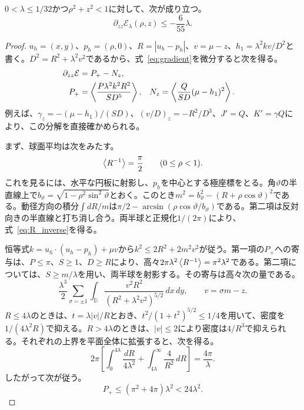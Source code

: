 \begin{lemma}[薄い扁平回転楕円体の一様な軸方向凹性]\label{lem:axial_concavity}
$0<\lambda\le1/32$かつ$\rho^2+z^2<1$に対して、次が成り立つ。
\begin{equation}\label{eq:thin_concavity}
 \partial_{zz}\mathcal E_\lambda(\rho,z)\le-\frac6{55}\lambda.
\end{equation}
\end{lemma}
\begin{proof}
$u_h=(x,y)$、$p_h=(\rho,0)$、$R=|u_h-p_h|$、$v=\mu-z$、$h_1=\lambda^2kv/D^2$と書く。$D^2=R^2+\lambda^2v^2$であるから、式~\eqref{eq:gradient}を微分すると次を得る。
\begin{align}
 \partial_{zz}\mathcal E&=P_+-N_z,\label{eq:positive_negative}\\
 P_+&=\left\langle \frac{P\lambda^2k^2R^2}{SD^5}\right\rangle,&
 N_z&=\left\langle \frac Q{SD}(\mu-h_1)^2\right\rangle.\nonumber
\end{align}
例えば、$\gamma_z=-(\mu-h_1)/(SD)$、$(v/D)_z=-R^2/D^3$、$J'=Q$、$K'=\gamma Q$により、この分解を直接確かめられる。

まず、球面平均は次をみたす。
\begin{equation}\label{eq:R_inverse}
 \left\langle R^{-1}\right\rangle=\frac\pi2\qquad(0\le\rho<1).
\end{equation}
これを見るには、水平な円板に射影し、$p_h$を中心とする極座標をとる。角$\vartheta$の半直線上で$b_\vartheta=\sqrt{1-\rho^2\sin^2\vartheta}$とおく。このとき$m^2=b_\vartheta^2-(R+\rho\cos\vartheta)^2$である。動径方向の積分$\int dR/m$は$\pi/2-\arcsin(\rho\cos\vartheta/b_\vartheta)$である。第二項は反対向きの半直線と打ち消し合う。両半球と正規化$1/(2\pi)$により、式~\eqref{eq:R_inverse}を得る。

恒等式$k=u_h\cdot(u_h-p_h)+\mu v$から$k^2\le2R^2+2m^2v^2$が従う。第一項の$P_+$への寄与は、$P\le\pi$、$S\ge1$、$D\ge R$により、高々$2\pi\lambda^2\left\langle R^{-1}\right\rangle=\pi^2\lambda^2$である。第二項については、$S\ge m/\lambda$を用い、両半球を射影する。その寄与は高々次の量である。
\[
 \frac{\lambda^3}{2}\sum_{\sigma=\pm1}\int_{\mathbb D}
 \frac{v^2R^2}{(R^2+\lambda^2v^2)^{5/2}}\,dx\,dy,
 \qquad v=\sigma m-z.
\]
$R\le4\lambda$のときは、$t=\lambda|v|/R$とおき、$t^2/(1+t^2)^{5/2}\le1/4$を用いて、密度を$1/(4\lambda^2R)$で抑える。$R>4\lambda$のときは、$|v|\le2$により密度は$4/R^3$で抑えられる。それぞれの上界を平面全体に拡張すると、次を得る。
\[
 2\pi\left[\int_0^{4\lambda}\frac{dR}{4\lambda^2}
       +\int_{4\lambda}^\infty\frac4{R^2}\,dR\right]=\frac{4\pi}{\lambda}.
\]
したがって次が従う。
\begin{equation}\label{eq:positive_bound}
 P_+\le(\pi^2+4\pi)\lambda^2<24\lambda^2.
\end{equation}


\end{proof}
